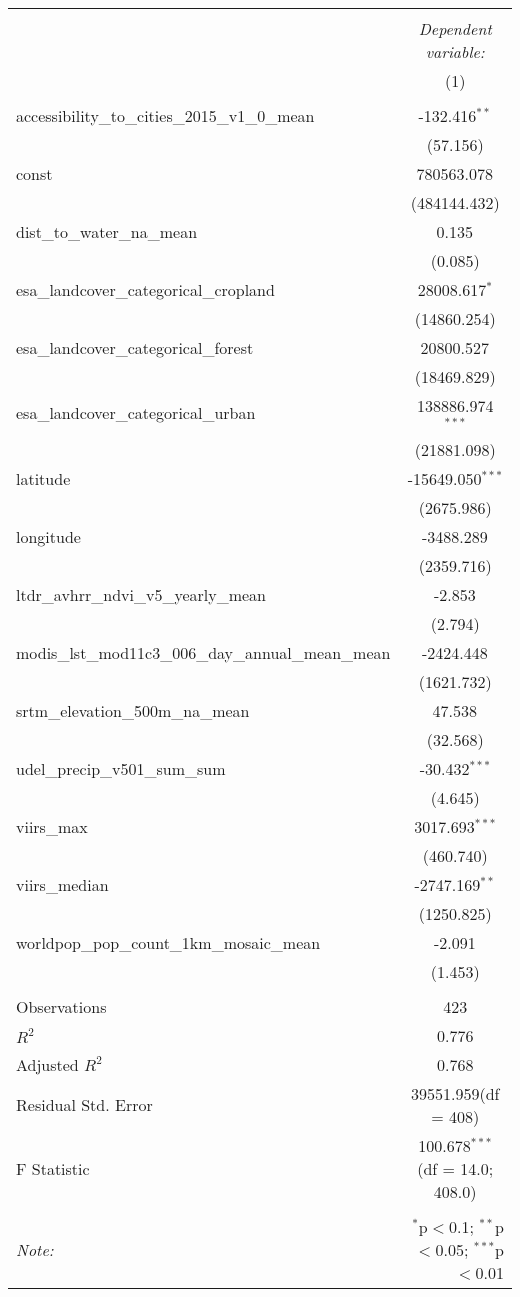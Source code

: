 \begin{table}[!htbp] \centering
\begin{tabular}{@{\extracolsep{5pt}}lc}
\\[-1.8ex]\hline
\hline \\[-1.8ex]
& \multicolumn{1}{c}{\textit{Dependent variable:}} \
\cr \cline{1-2}
\\[-1.8ex] & (1) \\
\hline \\[-1.8ex]
 accessibility_to_cities_2015_v1_0_mean & -132.416$^{**}$ \\
  & (57.156) \\
 const & 780563.078$^{}$ \\
  & (484144.432) \\
 dist_to_water_na_mean & 0.135$^{}$ \\
  & (0.085) \\
 esa_landcover_categorical_cropland & 28008.617$^{*}$ \\
  & (14860.254) \\
 esa_landcover_categorical_forest & 20800.527$^{}$ \\
  & (18469.829) \\
 esa_landcover_categorical_urban & 138886.974$^{***}$ \\
  & (21881.098) \\
 latitude & -15649.050$^{***}$ \\
  & (2675.986) \\
 longitude & -3488.289$^{}$ \\
  & (2359.716) \\
 ltdr_avhrr_ndvi_v5_yearly_mean & -2.853$^{}$ \\
  & (2.794) \\
 modis_lst_mod11c3_006_day_annual_mean_mean & -2424.448$^{}$ \\
  & (1621.732) \\
 srtm_elevation_500m_na_mean & 47.538$^{}$ \\
  & (32.568) \\
 udel_precip_v501_sum_sum & -30.432$^{***}$ \\
  & (4.645) \\
 viirs_max & 3017.693$^{***}$ \\
  & (460.740) \\
 viirs_median & -2747.169$^{**}$ \\
  & (1250.825) \\
 worldpop_pop_count_1km_mosaic_mean & -2.091$^{}$ \\
  & (1.453) \\
\hline \\[-1.8ex]
 Observations & 423 \\
 $R^2$ & 0.776 \\
 Adjusted $R^2$ & 0.768 \\
 Residual Std. Error & 39551.959(df = 408)  \\
 F Statistic & 100.678$^{***}$ (df = 14.0; 408.0) \\
\hline
\hline \\[-1.8ex]
\textit{Note:} & \multicolumn{1}{r}{$^{*}$p$<$0.1; $^{**}$p$<$0.05; $^{***}$p$<$0.01} \\
\end{tabular}
\end{table}